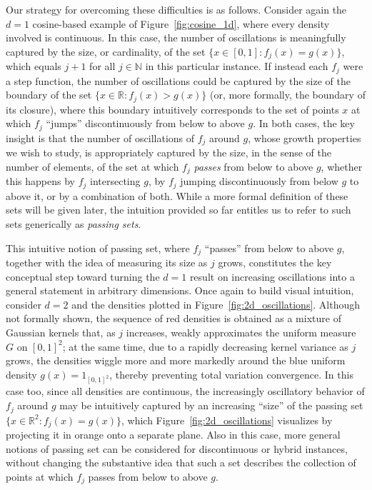 \documentclass[12pt]{article}
\begin{document}
Our strategy for overcoming these difficulties is as follows. Consider again the $d=1$ cosine-based example of Figure~\ref{fig:cosine_1d}, where every density involved is continuous. In this case, the number of oscillations is meaningfully captured by the size, or cardinality, of the set $\{x\in[0,1]:f_j(x)=g(x)\}$, which equals $j+1$ for all $j\in\mathbb N$ in this particular instance. If instead each $f_j$ were a step function, the number of oscillations could be captured by the size of the boundary of the set $\{x\in\mathbb R : f_j(x)>g(x)\}$ (or, more formally, the boundary of its closure), where this boundary intuitively corresponds to the set of points $x$ at which $f_j$ ``jumps'' discontinuously from below to above $g$. In both cases, the key insight is that the number of oscillations of $f_j$ around $g$, whose growth properties we wish to study, is appropriately captured by the size, in the sense of the number of elements, of the set at which $f_j$ \emph{passes} from below to above $g$, whether this happens by $f_j$ intersecting $g$, by $f_j$ jumping discontinuously from below $g$ to above it, or by a combination of both. While a more formal definition of these sets will be given later, the intuition provided so far entitles us to refer to such sets generically as \emph{passing sets}.

This intuitive notion of passing set, where $f_j$ ``passes'' from below to above $g$, together with the idea of measuring its size as $j$ grows, constitutes the key conceptual step toward turning the $d=1$ result on increasing oscillations into a general statement in arbitrary dimensions. Once again to build visual intuition, consider $d=2$ and the densities plotted in Figure~\ref{fig:2d_oscillations}. Although not formally shown, the sequence of red densities is obtained as a mixture of Gaussian kernels that, as $j$ increases, weakly approximates the uniform measure $G$ on $[0,1]^2$; at the same time, due to a rapidly decreasing kernel variance as $j$ grows, the densities wiggle more and more markedly around the blue uniform density $g(x)=1_{[0,1]^2}$, thereby preventing total variation convergence. In this case too, since all densities are continuous, the increasingly oscillatory behavior of $f_j$ around $g$ may be intuitively captured by an increasing ``size'' of the passing set $\{x\in \mathbb R^2 : f_j(x)=g(x)\}$, which Figure~\ref{fig:2d_oscillations} visualizes by projecting it in orange onto a separate plane. Also in this case, more general notions of passing set can be considered for discontinuous or hybrid instances, without changing the substantive idea that such a set describes the collection of points at which $f_j$ passes from below to above $g$.
\end{document}

